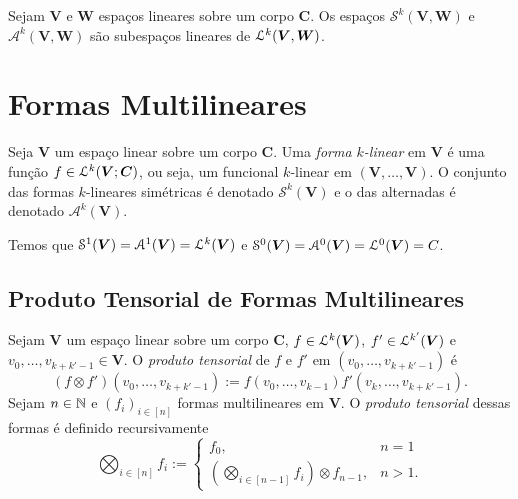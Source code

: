 \begin{prop}
Sejam $\bm V$ e $\bm W$ espaços lineares sobre um corpo $\bm C$. Os espaços $\mathcal S^k(\bm V,\bm W)$ e $\mathcal A^k(\bm V,\bm W)$ são subespaços lineares de $\mathcal{L}^k(\bm V,\bm W)$.
\end{prop}

\section{Formas Multilineares}

\begin{defi}
Seja $\bm V$ um espaço linear sobre um corpo $\bm C$. Uma \emph{forma $k$-linear} em $\bm V$ é uma função $f \in \mathcal{L}^k(\bm V;\bm C)$, ou seja, um funcional $k$-linear em $(\bm V,\ldots,\bm V)$. O conjunto das formas $k$-lineares simétricas é denotado $\mathcal{S}^k(\bm V)$ e o das alternadas é denotado $\mathcal{A}^k(\bm V)$.
\end{defi}

Temos que $\mathcal{S}^1(\bm V) = \mathcal{A}^1(\bm V) = \mathcal{L}^k(\bm V)$ e $\mathcal{S}^0(\bm V) = \mathcal{A}^0(\bm V) = \mathcal{L}^0(\bm V) = C$.

\subsection{Produto Tensorial de Formas Multilineares}

\begin{defi}
Sejam $\bm V$ um espaço linear sobre um corpo $\bm C$, $f \in \mathcal{L}^k(\bm V)$, $f' \in \mathcal{L}^{k'}(\bm V)$ e $v_0,\ldots,v_{k+k'-1} \in \bm V$. O \emph{produto tensorial} de $f$ e $f'$ em $(v_0,\ldots,v_{k+k'-1})$ é
	\begin{equation*}
	(f \otimes f')(v_0,\ldots,v_{k+k'-1}) := f(v_0,\ldots,v_{k-1})f'(v_k,\ldots,v_{k+k'-1}).
	\end{equation*}
Sejam $n \in \mathbb{N}$ e $(f_i)_{i \in [n]}$ formas multilineares em $\bm V$. O \emph{produto tensorial} dessas formas é definido recursivamente
	\begin{equation*}
	\bigotimes_{i \in [n]} f_i := \begin{cases}
		f_0,& n=1 \\
		\left(\displaystyle\bigotimes_{i \in [n-1]} f_i \right) \otimes f_{n-1} ,& n>1.
	\end{cases}
	\end{equation*}
\end{defi}

